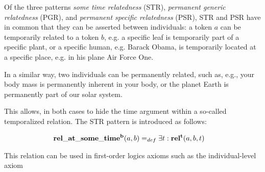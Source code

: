 
Of the three patterns \emph{some time relatedness} (STR), \emph{permanent generic relatedness} (PGR), and \emph{permanent specific relatedness} (PSR), STR and PSR have in common that they can be asserted between individuals: a token $a$ can be temporarily related to a token $b$, e.g. 
a specific leaf is temporarily part of a specific plant, or a specific human, e.g. Barack Obama, 
is temporarily located at a specific place, e.g. in his plane Air Force One.

In a similar way, two individuals can be permanently related, such as, e.g., your body mass 
is permanently inherent in your body, or the planet Earth is permanently part of our solar system.

This allows, in both cases to hide the time argument within a so-called temporalized relation.
The STR pattern is introduced as follows:  

\begin{equation}
\begin{split}
\mathrm{\mathbf{rel\_at\_some\_time^b}} (a,b) =_{def}&\; \exists t: \mathrm{\mathbf{rel^t}}(a,b,t)  
\end{split}
\label{eq:temporarily:ind}
\end{equation}

This relation can be used in first-order logics axioms such as the individual-level axiom


